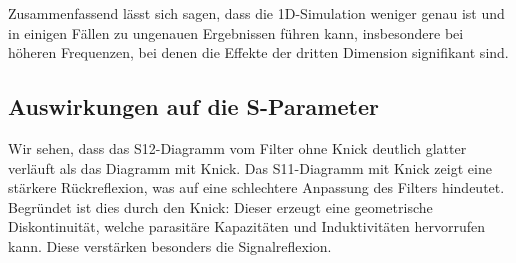 Zusammenfassend lässt sich sagen, dass die 1D-Simulation weniger genau ist und in einigen Fällen zu ungenauen Ergebnissen führen kann, insbesondere bei höheren Frequenzen, bei denen die Effekte der dritten Dimension signifikant sind.

\subsection{Auswirkungen auf die S-Parameter}
Wir sehen, dass das S12-Diagramm vom Filter ohne Knick deutlich glatter verläuft als das Diagramm mit Knick.
Das S11-Diagramm mit Knick zeigt eine stärkere Rückreflexion, was auf eine schlechtere Anpassung des Filters
hindeutet.
Begründet ist dies durch den Knick: Dieser erzeugt eine geometrische Diskontinuität, welche parasitäre Kapazitäten und Induktivitäten hervorrufen kann.
Diese verstärken besonders die Signalreflexion.